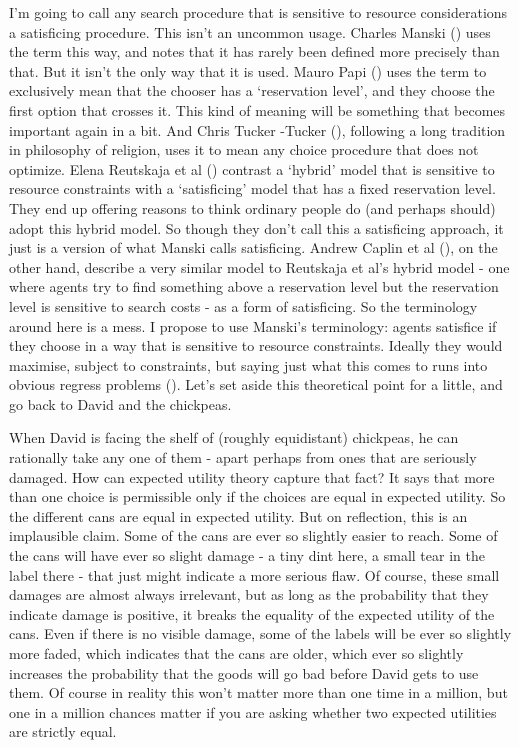 \documentclass[
  10pt,
  letterpaper,
  twoside]{scrbook}
\begin{document}
I'm going to call any search procedure that is sensitive to resource
considerations a satisficing procedure. This isn't an uncommon usage.
Charles Manski () uses the term this way,
and notes that it has rarely been defined more precisely than that. But
it isn't the only way that it is used. Mauro Papi
() uses the term to exclusively mean that
the chooser has a `reservation level', and they choose the first option
that crosses it. This kind of meaning will be something that becomes
important again in a bit. And Chris Tucker -Tucker
(), following a long tradition in
philosophy of religion, uses it to mean any choice procedure that does
not optimize. Elena Reutskaja et al ()
contrast a `hybrid' model that is sensitive to resource constraints with
a `satisficing' model that has a fixed reservation level. They end up
offering reasons to think ordinary people do (and perhaps should) adopt
this hybrid model. So though they don't call this a satisficing
approach, it just is a version of what Manski calls satisficing. Andrew
Caplin et al (), on the other hand,
describe a very similar model to Reutskaja et al's hybrid model - one
where agents try to find something above a reservation level but the
reservation level is sensitive to search costs - as a form of
satisficing. So the terminology around here is a mess. I propose to use
Manski's terminology: agents satisfice if they choose in a way that is
sensitive to resource constraints. Ideally they would maximise, subject
to constraints, but saying just what this comes to runs into obvious
regress problems (). Let's set
aside this theoretical point for a little, and go back to David and the
chickpeas.

When David is facing the shelf of (roughly equidistant) chickpeas, he
can rationally take any one of them - apart perhaps from ones that are
seriously damaged. How can expected utility theory capture that fact? It
says that more than one choice is permissible only if the choices are
equal in expected utility. So the different cans are equal in expected
utility. But on reflection, this is an implausible claim. Some of the
cans are ever so slightly easier to reach. Some of the cans will have
ever so slight damage - a tiny dint here, a small tear in the label
there - that just might indicate a more serious flaw. Of course, these
small damages are almost always irrelevant, but as long as the
probability that they indicate damage is positive, it breaks the
equality of the expected utility of the cans. Even if there is no
visible damage, some of the labels will be ever so slightly more faded,
which indicates that the cans are older, which ever so slightly
increases the probability that the goods will go bad before David gets
to use them. Of course in reality this won't matter more than one time
in a million, but one in a million chances matter if you are asking
whether two expected utilities are strictly equal.
\end{document}
